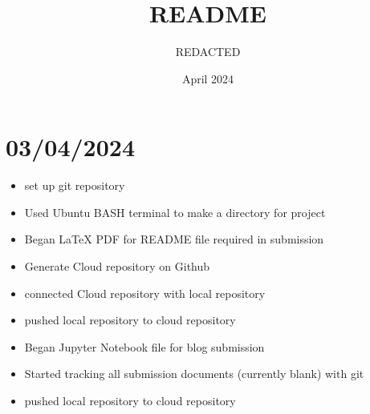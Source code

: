 \documentclass{article}
\title{README}
\author{REDACTED}
\date{April 2024}
\begin{document}
\maketitle

\section{03/04/2024}
\begin{itemize}
    \item set up git repository
    \item Used Ubuntu BASH terminal to make a directory for project
    \item Began LaTeX PDF for README file required in submission
    \item Generate Cloud repository on Github 
    \item connected Cloud repository with local repository
    \item pushed local repository to cloud repository
    \item Began Jupyter Notebook file for blog submission
    \item Started tracking all submission documents (currently blank) with git
    \item pushed local repository to cloud repository
\end{itemize}
\end{document}
